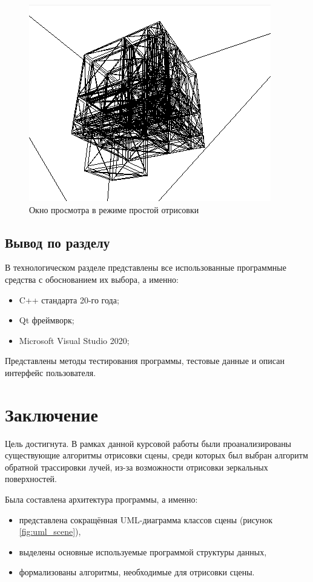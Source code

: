 \begin{figure}[ht]
	\centering
	\includegraphics[width=0.7\linewidth]{img/scene_carcass}
	\caption{Окно просмотра в режиме простой отрисовки}
	\label{fig:scenecarcass}
\end{figure}

\subsection{Вывод по разделу}
В технологическом разделе представлены все использованные программные средства с обоснованием их выбора, а именно:
\begin{itemize}
	\item C++ стандарта 20-го года;
	\item Qt фреймворк;
	\item Microsoft Visual Studio 2020;
\end{itemize}

Представлены методы тестирования программы, тестовые данные и описан интерфейс пользователя.

\section*{Заключение}
Цель достигнута. В рамках данной курсовой работы были проанализированы существующие алгоритмы отрисовки сцены, среди которых был выбран алгоритм обратной трассировки лучей, из-за возможности отрисовки зеркальных поверхностей.

Была составлена архитектура программы, а именно:
\begin{itemize}
	\item представлена сокращённая UML-диаграмма классов сцены (рисунок \ref{fig:uml_scene}),
	\item выделены основные используемые программой структуры данных,
	\item формализованы алгоритмы, необходимые для отрисовки сцены.
\end{itemize}

